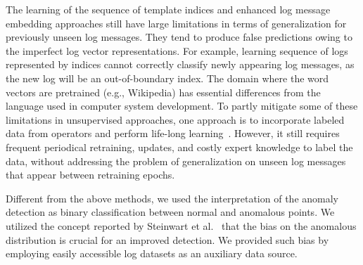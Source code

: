 The learning of the sequence of template indices and enhanced log message embedding approaches still have large limitations in terms of generalization for previously unseen log messages. They tend to produce false predictions owing to the imperfect log vector representations. For example, learning sequence of logs represented by indices cannot correctly classify newly appearing log messages, as the new log will be an out-of-boundary index. The domain where the word vectors are pretrained (e.g., Wikipedia) has essential differences from the language used in computer system development. To partly mitigate some of these limitations in unsupervised approaches, one approach is to incorporate labeled data from operators and perform life-long learning~\cite{du2019lifelong}. However, it still requires frequent periodical retraining, updates, and costly expert knowledge to label the data, without addressing the problem of generalization on unseen log messages that appear between retraining epochs. 

Different from the above methods, we used the interpretation of the anomaly detection as binary classification between normal and anomalous points. We utilized the concept reported by Steinwart et al.~\cite{steinwart2005classification} that the bias on the anomalous distribution is crucial for an improved detection. We provided such bias by employing easily accessible log datasets as an auxiliary data source. 

